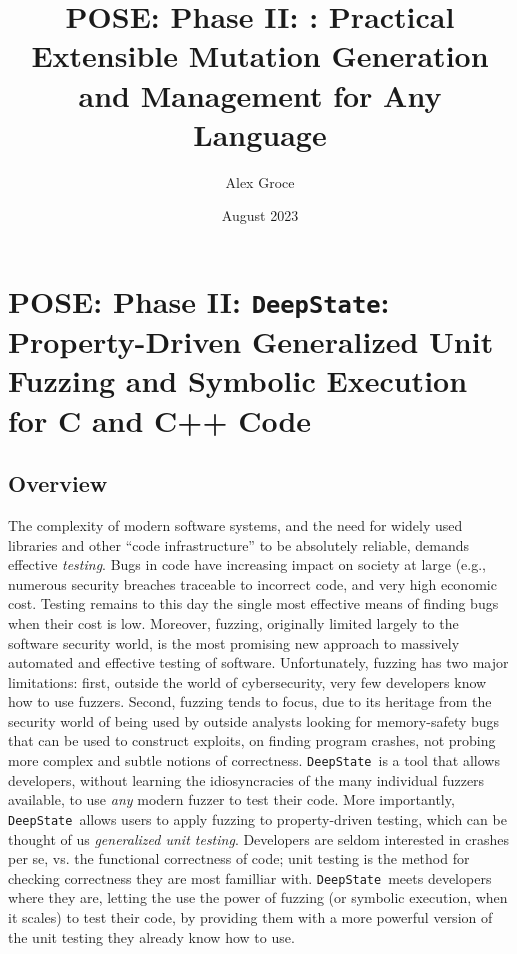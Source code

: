 \documentclass[numbers]{proposalnsf}
\title{POSE: Phase II: \ds: Practical Extensible Mutation Generation and Management for Any Language}
\author{Alex Groce }
\date{August 2023}
\newcommand{\ds}{\texttt{DeepState}}
\begin{document}
\section*{POSE: Phase II: \ds: Property-Driven Generalized Unit Fuzzing and Symbolic Execution for C and C++ Code}

\subsection*{Overview}
\vspace{-2mm}


The complexity of modern software systems, and the need for widely used libraries and other ``code infrastructure'' to be absolutely reliable, demands effective \emph{testing}.  Bugs in code have increasing impact on society at large (e.g., numerous security breaches traceable to incorrect code, and very high economic cost.  Testing remains to this day the single most effective means of finding bugs when their cost is low.   Moreover, fuzzing, originally limited largely to the software security world, is the most promising new approach to massively automated and effective testing of software.  Unfortunately, fuzzing has two major limitations: first, outside the world of cybersecurity, very few developers know how to use fuzzers.  Second, fuzzing tends to focus, due to its heritage from the security world of being used by outside analysts looking for memory-safety bugs that can be used to construct exploits, on finding program crashes, not probing more complex and subtle notions of correctness.  \ds\ is a tool that allows developers, without learning the idiosyncracies of the many individual fuzzers available, to use \emph{any} modern fuzzer to test their code.  More importantly, \ds\ allows users to apply fuzzing to property-driven testing, which can be thought of us \emph{generalized unit testing}.  Developers are seldom interested in crashes per se, vs. the functional correctness of code; unit testing is the method for checking correctness they are most familliar with.  \ds\ meets developers where they are, letting the use the power of fuzzing (or symbolic execution, when it scales) to test their code, by providing them with a more powerful version of the unit testing they already know how to use.
\end{document}
